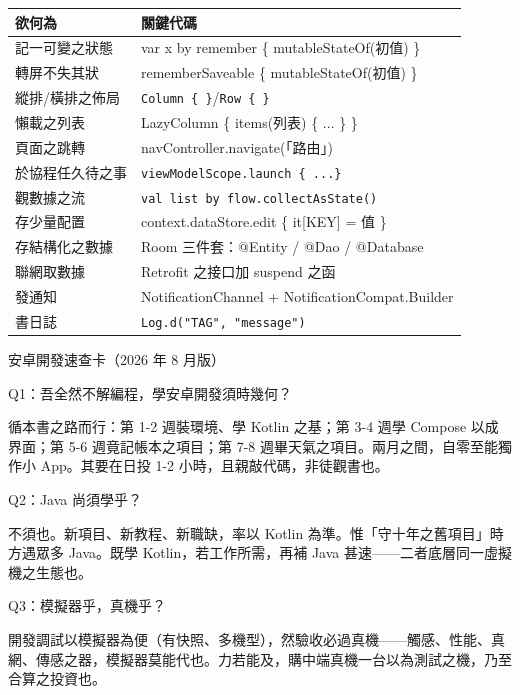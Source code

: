 


\begin{center}
\begin{tabularx}{\linewidth}{|X|X|}
\hline
\textbf{欲何為} & \textbf{關鍵代碼} \tabularnewline
\hline
記一可變之狀態 & var x by remember \{ mutableStateOf(初值) \} \tabularnewline
轉屏不失其狀 & rememberSaveable \{ mutableStateOf(初值) \} \tabularnewline
縱排/橫排之佈局 & \texttt{Column \{ \}}/\texttt{Row \{ \}} \tabularnewline
懶載之列表 & LazyColumn \{ items(列表) \{ ... \} \} \tabularnewline
頁面之跳轉 & navController.navigate(「路由」) \tabularnewline
於協程任久待之事 & \texttt{viewModelScope.\allowbreak launch \{ .\allowbreak .\allowbreak .\allowbreak  \}} \tabularnewline
觀數據之流 & \texttt{val list by flow.\allowbreak collectAsState()} \tabularnewline
存少量配置 & context.dataStore.edit \{ it[KEY] = 值 \} \tabularnewline
存結構化之數據 & Room 三件套：@Entity / @Dao / @Database \tabularnewline
聯網取數據 & Retrofit 之接口加 suspend 之函 \tabularnewline
發通知 & NotificationChannel + NotificationCompat.Builder \tabularnewline
書日誌 & \texttt{Log.\allowbreak d("TAG", "message")} \tabularnewline
\hline
\end{tabularx}
\end{center}

\begin{center}\small\color{gray}安卓開發速查卡（2026 年 8 月版）\end{center}


Q1：吾全然不解編程，學安卓開發須時幾何？

循本書之路而行：第 1-2 週裝環境、學 Kotlin 之基；第 3-4 週學 Compose 以成界面；第 5-6 週竟記帳本之項目；第 7-8 週畢天氣之項目。兩月之間，自零至能獨作小 App。其要在日投 1-2 小時，且親敲代碼，非徒觀書也。

Q2：Java 尚須學乎？

不須也。新項目、新教程、新職缺，率以 Kotlin 為準。惟「守十年之舊項目」時方遇眾多 Java。既學 Kotlin，若工作所需，再補 Java 甚速——二者底層同一虛擬機之生態也。

Q3：模擬器乎，真機乎？

開發調試以模擬器為便（有快照、多機型），然驗收必過真機——觸感、性能、真網、傳感之器，模擬器莫能代也。力若能及，購中端真機一台以為測試之機，乃至合算之投資也。

